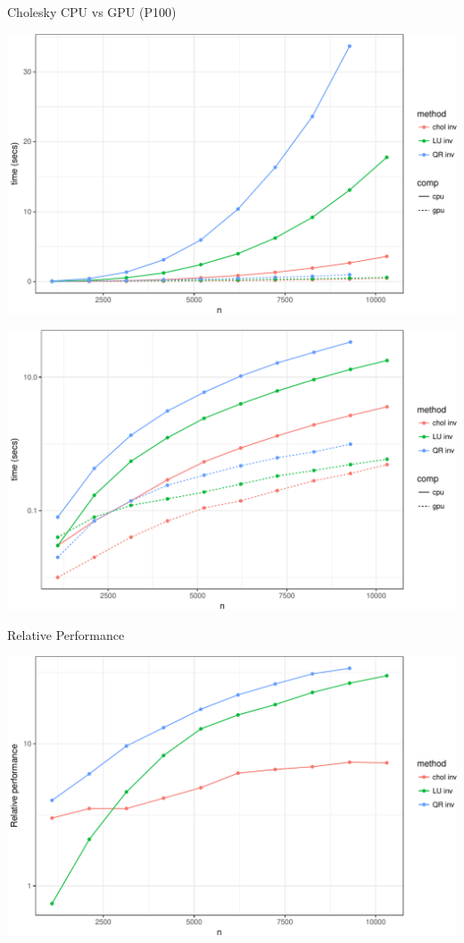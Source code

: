 \documentclass[11pt,ignorenonframetext,]{beamer}
\begin{document}
\begin{frame}{Cholesky CPU vs GPU (P100)}

\includegraphics{Lec22_files/figure-beamer/unnamed-chunk-2-1.pdf}

\end{frame}

\begin{frame}{}

\includegraphics{Lec22_files/figure-beamer/unnamed-chunk-3-1.pdf}

\end{frame}

\begin{frame}{Relative Performance}

\includegraphics{Lec22_files/figure-beamer/unnamed-chunk-4-1.pdf}

\end{frame}
\end{document}
